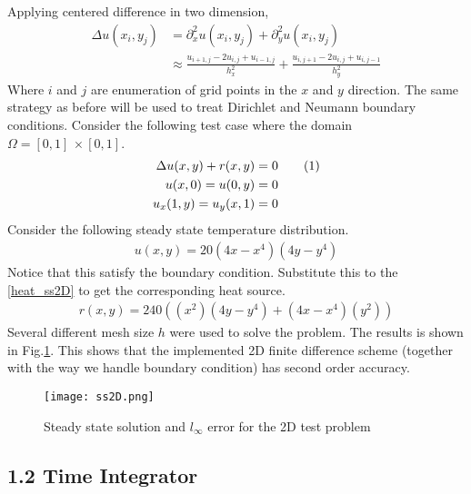 \documentclass[11pt, letterpaper, hidelinks]{article}
\theoremstyle{definition}
\newcommand\numberthis{\addtocounter{equation}{1}\tag{\theequation}}
\newcommand{\x}{\, \times}
\begin{document}
Applying centered difference in two dimension,
\begin{align*}
    \Delta u(x_i,y_j) & = \partial_x^2 u(x_i,y_j) + \partial_y^2 u(x_i,y_j)                                                   \\
                      & \approx \frac{u_{i+1,j} -2u_{i,j} + u_{i-1,j}}{h_x^2} + \frac{u_{i,j+1} -2u_{i,j} + u_{i,j-1}}{h_y^2}
\end{align*}
Where $i$ and $j$ are enumeration of grid points in the $x$ and $y$ direction. The same strategy as before will be used to treat Dirichlet and Neumann boundary conditions. Consider the following test case where the domain $\Omega=[0,1]\x[0,1]$.
\begin{align*}
    \Delta u(x,y) + r(x,y) & = 0  \numberthis \label{heat_ss2D} \\
    u(x,0)=u(0,y)          & = 0                                \\
    u_x(1,y)=u_y(x,1)      & = 0
\end{align*}
Consider the following steady state temperature distribution.
\begin{align*}
    u(x,y) = 20(4x-x^4)(4y-y^4)
\end{align*}
Notice that this satisfy the boundary condition. Substitute this to the \eqref{heat_ss2D} to get the corresponding heat source.
\begin{align*}
    r(x,y) = 240\left((x^2)(4y-y^4)+(4x-x^4)(y^2)\right)
\end{align*}
Several different mesh size $h$ were used to solve the problem. The results is shown in Fig.\ref{fig:ss2D}. This shows that the implemented 2D finite difference scheme (together with the way we handle boundary condition) has second order accuracy.
\begin{figure}[H]
    \texttt{[image: ss2D.png]}
    \centering
    \caption{Steady state solution and $l_\infty$ error for the 2D test problem}
    \label{fig:ss2D}
\end{figure}

\subsection{1.2 Time Integrator}
\end{document}
